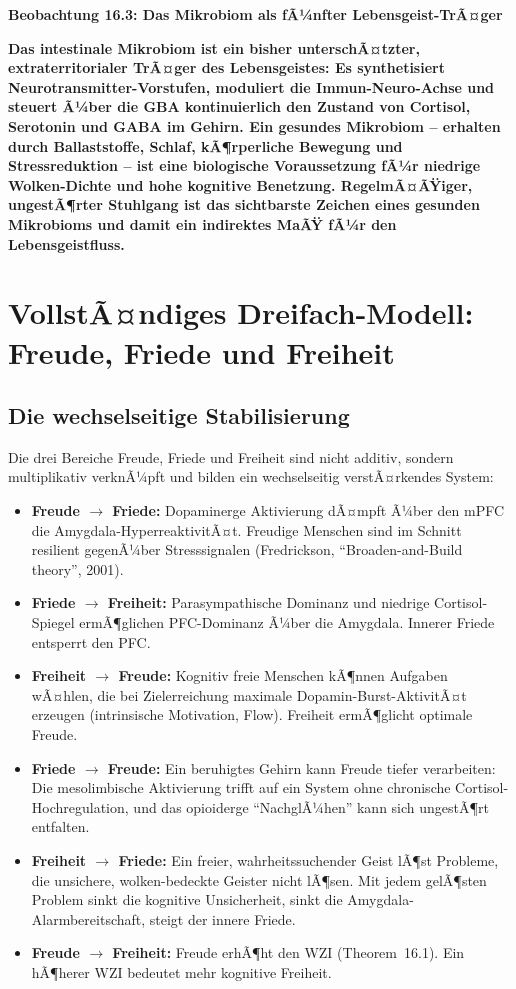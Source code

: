 ﻿\documentclass[12pt,a4paper]{report}
\theoremstyle{plain}
\theoremstyle{definition}
\theoremstyle{remark}
\begin{document}
	
	\noindent\textbf{Beobachtung 16.3: Das Mikrobiom als fÃ¼nfter Lebensgeist-TrÃ¤ger}

		\textbf{Das intestinale Mikrobiom ist ein bisher unterschÃ¤tzter,
		extraterritorialer TrÃ¤ger des Lebensgeistes: Es synthetisiert
		Neurotransmitter-Vorstufen, moduliert die Immun-Neuro-Achse
		und steuert Ã¼ber die GBA kontinuierlich den Zustand von
		Cortisol, Serotonin und GABA im Gehirn. Ein gesundes Mikrobiom
		-- erhalten durch Ballaststoffe, Schlaf, kÃ¶rperliche Bewegung
		und Stressreduktion -- ist eine biologische Voraussetzung
		fÃ¼r niedrige Wolken-Dichte und hohe kognitive Benetzung.
		RegelmÃ¤ÃŸiger, ungestÃ¶rter Stuhlgang ist das sichtbarste
		Zeichen eines gesunden Mikrobioms und damit ein
		indirektes MaÃŸ fÃ¼r den Lebensgeistfluss.}


	\section{VollstÃ¤ndiges Dreifach-Modell: Freude, Friede und Freiheit}

	\subsection{Die wechselseitige Stabilisierung}

	Die drei Bereiche Freude, Friede und Freiheit sind nicht additiv,
	sondern multiplikativ verknÃ¼pft und bilden ein wechselseitig
	verstÃ¤rkendes System:

	\begin{itemize}
		\item \textbf{Freude $\to$ Friede:} Dopaminerge Aktivierung
		dÃ¤mpft Ã¼ber den mPFC die Amygdala-HyperreaktivitÃ¤t.
		Freudige Menschen sind im Schnitt resilient gegenÃ¼ber Stresssignalen
		(Fredrickson, ``Broaden-and-Build theory'', 2001).
		\item \textbf{Friede $\to$ Freiheit:} Parasympathische Dominanz
		und niedrige Cortisol-Spiegel ermÃ¶glichen PFC-Dominanz Ã¼ber
		die Amygdala. Innerer Friede entsperrt den PFC.
		\item \textbf{Freiheit $\to$ Freude:} Kognitiv freie Menschen
		kÃ¶nnen Aufgaben wÃ¤hlen, die bei Zielerreichung maximale
		Dopamin-Burst-AktivitÃ¤t erzeugen (intrinsische Motivation,
		Flow). Freiheit ermÃ¶glicht optimale Freude.
		\item \textbf{Friede $\to$ Freude:} Ein beruhigtes Gehirn
		kann Freude tiefer verarbeiten: Die mesolimbische Aktivierung
		trifft auf ein System ohne chronische Cortisol-Hochregulation,
		und das opioiderge ``NachglÃ¼hen'' kann sich ungestÃ¶rt entfalten.
		\item \textbf{Freiheit $\to$ Friede:} Ein freier, wahrheitssuchender
		Geist lÃ¶st Probleme, die unsichere, wolken-bedeckte Geister
		nicht lÃ¶sen. Mit jedem gelÃ¶sten Problem sinkt die kognitive
		Unsicherheit, sinkt die Amygdala-Alarmbereitschaft,
		steigt der innere Friede.
		\item \textbf{Freude $\to$ Freiheit:} Freude erhÃ¶ht den WZI
		(Theorem~16.1). Ein hÃ¶herer WZI bedeutet mehr kognitive Freiheit.
	\end{itemize}
\end{document}
